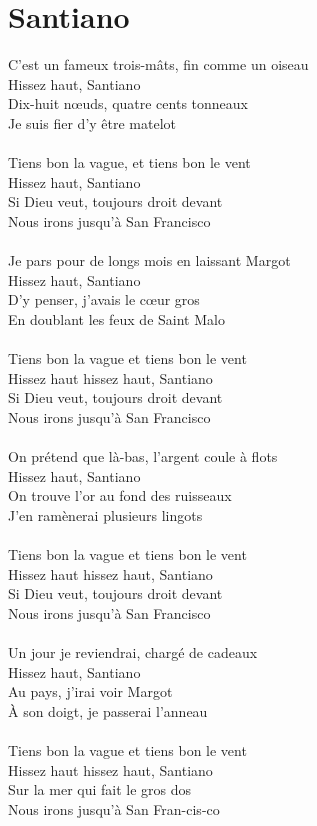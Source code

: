 \section*{Santiano}
C'est un fameux trois-mâts, fin comme un oiseau\\
Hissez haut, Santiano\\
Dix-huit nœuds, quatre cents tonneaux\\
Je suis fier d'y être matelot\\\\
Tiens bon la vague, et tiens bon le vent\\
Hissez haut, Santiano\\
Si Dieu veut, toujours droit devant\\
Nous irons jusqu'à San Francisco\\\\
Je pars pour de longs mois en laissant Margot\\
Hissez haut, Santiano\\
D'y penser, j'avais le cœur gros\\
En doublant les feux de Saint Malo\\\\
Tiens bon la vague et tiens bon le vent\\
Hissez haut hissez haut, Santiano\\
Si Dieu veut, toujours droit devant\\
Nous irons jusqu'à San Francisco\\\\
On prétend que là-bas, l'argent coule à flots\\
Hissez haut, Santiano\\
On trouve l'or au fond des ruisseaux\\
J'en ramènerai plusieurs lingots\\\\
Tiens bon la vague et tiens bon le vent\\
Hissez haut hissez haut, Santiano\\
Si Dieu veut, toujours droit devant\\
Nous irons jusqu'à San Francisco\\\\
Un jour je reviendrai, chargé de cadeaux\\
Hissez haut, Santiano\\
Au pays, j'irai voir Margot\\
À son doigt, je passerai l'anneau\\\\
Tiens bon la vague et tiens bon le vent\\
Hissez haut hissez haut, Santiano\\
Sur la mer qui fait le gros dos\\
Nous irons jusqu'à San Fran-cis-co\\\\